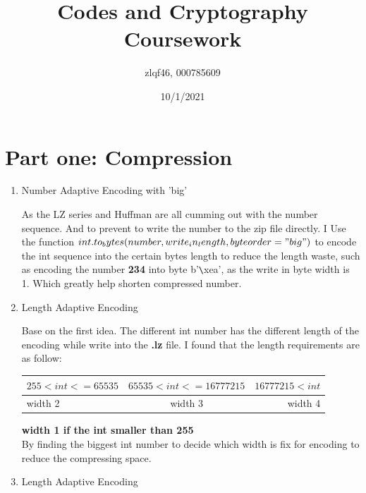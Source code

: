 \documentclass[margin 2cm]{report}
\title{\textbf{Codes and Cryptography Coursework}}
\author{zlqf46, 000785609}
\date{10/1/2021}
\begin{document}
\maketitle
\section[1]{\Large Part one: Compression}
\begin{enumerate}
\normalsize\item[1)]{Number Adaptive Encoding with 'big'}
\begin{spacing}{1.5}
\normalsize\indent\setlength{\parindent}{2em}As the LZ series and Huffman are all cumming out with the number sequence. And to prevent to write the number to the zip file directly. I Use the function $int.to_bytes(number, write_in_length, byteorder="big")$ to encode the int sequence into the certain bytes length to reduce the length waste, such as encoding the number \textbf{234} into byte b'\verb|\|xea', as the write in byte width is 1. Which greatly help shorten compressed number.
\end{spacing}

\normalsize\item[2)]{Length Adaptive Encoding}
\begin{spacing}{1.5}
\normalsize\indent\setlength{\parindent}{2em}Base on the first idea. The different int number has the different length of the encoding while write into the \textbf{.lz} file. I found that the length requirements are as follow:
\newline
\newline
\begin{tabular}{|l|c|r|}
\hline
$255<int<=65535$&$65535<int<=16777215$&$16777215<int$\\
\hline
width 2&width 3&width 4\\
\hline
\end{tabular}
\newline\normalsize\textbf{width 1 if the int smaller than 255}\\
By finding the biggest int number to decide which width is fix for encoding to reduce the compressing space.
\end{spacing}

\normalsize\item[3)]{Length Adaptive Encoding}
\begin{spacing}{1.5}
\normalsize\indent\setlength{\parindent}{2em}


\end{spacing}


\end{enumerate}
\end{document}
